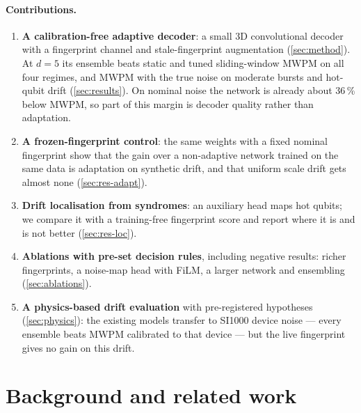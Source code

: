 \documentclass[11pt,a4paper]{article}
\begin{document}
\paragraph{Contributions.}
\begin{enumerate}[label=(\alph*), leftmargin=2em]
  \item \textbf{A calibration-free adaptive decoder}: a small 3D convolutional decoder with a fingerprint channel and
        stale-fingerprint augmentation (\cref{sec:method}). At $d=5$ its ensemble beats static and tuned sliding-window
        MWPM on all four regimes, and MWPM with the true noise on moderate bursts and hot-qubit drift (\cref{sec:results}).
        On nominal noise the network is already about 36\,\% below MWPM, so part of this margin is decoder quality
        rather than adaptation.
  \item \textbf{A frozen-fingerprint control}: the same weights with a fixed nominal fingerprint show that the gain
        over a non-adaptive network trained on the same data is adaptation on synthetic drift, and that uniform
        scale drift gets almost none (\cref{sec:res-adapt}).
  \item \textbf{Drift localisation from syndromes}: an auxiliary head maps hot qubits; we compare it with a
        training-free fingerprint score and report where it is and is not better (\cref{sec:res-loc}).
  \item \textbf{Ablations with pre-set decision rules}, including negative results: richer fingerprints, a noise-map
        head with FiLM, a larger network and ensembling (\cref{sec:ablations}).
  \item \textbf{A physics-based drift evaluation} with pre-registered hypotheses (\cref{sec:physics}): the
        existing models transfer to SI1000 device noise --- every ensemble beats MWPM calibrated to that
        device --- but the live fingerprint gives no gain on this drift.
\end{enumerate}

\section{Background and related work}\label{sec:background}
\end{document}
